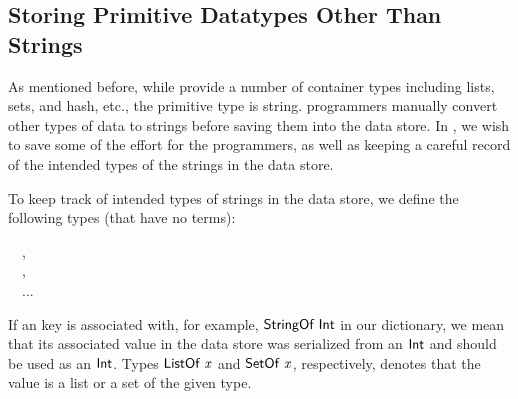 \subsection{Storing Primitive Datatypes Other Than Strings}
\label{sec:polymorphic-redis}

As mentioned before, while \Redis{} provide a number of container types
including lists, sets, and hash, etc., the primitive type is string.
\Hedis{} programmers manually convert other types of data to strings before
saving them into the data store. In \Edis{}, we wish to save some of the
effort for the programmers, as well as keeping a careful record of the intended
types of the strings in the data store.

To keep track of intended types of strings in the data store, we define the
following types (that have no terms):
\begin{hscode}\SaveRestoreHook
{}%
%
\>[B]{}\;\;~~,{}\<[E]%
\\
\>[B]{}\;\;~~,{}\<[E]%
\\
\>[B]{}\;\;~~...{}\<[E]%
\ColumnHook
\end{hscode}\resethooks
If an key is associated with, for example, \ensuremath{\Conid{StringOf}\;\Conid{Int}} in
our dictionary, we mean that its associated value in the data store was
serialized from an \ensuremath{\Conid{Int}} and should be used as an \ensuremath{\Conid{Int}}. Types
\ensuremath{\Conid{ListOf}\;\Varid{x}} and \ensuremath{\Conid{SetOf}\;\Varid{x}}, respectively, denotes that the value is a list
or a set of the given type.

